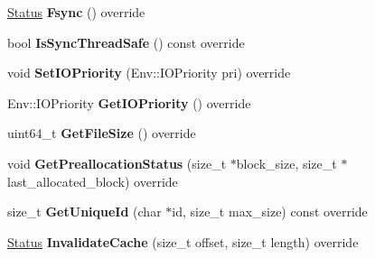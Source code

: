 \begin{DoxyCompactItemize}
\item 
\hyperlink{classrocksdb_1_1Status}{Status} {\bfseries Fsync} () override\hypertarget{classrocksdb_1_1WritableFileWrapper_addf5860aaa2745c0543c3fb2ba77c8d3}{}\label{classrocksdb_1_1WritableFileWrapper_addf5860aaa2745c0543c3fb2ba77c8d3}

\item 
bool {\bfseries Is\+Sync\+Thread\+Safe} () const override\hypertarget{classrocksdb_1_1WritableFileWrapper_abf6391522a133bbb532f34c60e1bae8a}{}\label{classrocksdb_1_1WritableFileWrapper_abf6391522a133bbb532f34c60e1bae8a}

\item 
void {\bfseries Set\+I\+O\+Priority} (Env\+::\+I\+O\+Priority pri) override\hypertarget{classrocksdb_1_1WritableFileWrapper_ab51961b1e6956249e33d8daec77ab511}{}\label{classrocksdb_1_1WritableFileWrapper_ab51961b1e6956249e33d8daec77ab511}

\item 
Env\+::\+I\+O\+Priority {\bfseries Get\+I\+O\+Priority} () override\hypertarget{classrocksdb_1_1WritableFileWrapper_a2b77b91c99b5c85c160fef7ea1db3a18}{}\label{classrocksdb_1_1WritableFileWrapper_a2b77b91c99b5c85c160fef7ea1db3a18}

\item 
uint64\+\_\+t {\bfseries Get\+File\+Size} () override\hypertarget{classrocksdb_1_1WritableFileWrapper_a3496a5c309a49099465d412f9a9dc813}{}\label{classrocksdb_1_1WritableFileWrapper_a3496a5c309a49099465d412f9a9dc813}

\item 
void {\bfseries Get\+Preallocation\+Status} (size\+\_\+t $\ast$block\+\_\+size, size\+\_\+t $\ast$last\+\_\+allocated\+\_\+block) override\hypertarget{classrocksdb_1_1WritableFileWrapper_a8f0f8c3ec4a18d25799d33dca8a935e0}{}\label{classrocksdb_1_1WritableFileWrapper_a8f0f8c3ec4a18d25799d33dca8a935e0}

\item 
size\+\_\+t {\bfseries Get\+Unique\+Id} (char $\ast$id, size\+\_\+t max\+\_\+size) const override\hypertarget{classrocksdb_1_1WritableFileWrapper_ab66f0f67f49cfb84240db1836417d793}{}\label{classrocksdb_1_1WritableFileWrapper_ab66f0f67f49cfb84240db1836417d793}

\item 
\hyperlink{classrocksdb_1_1Status}{Status} {\bfseries Invalidate\+Cache} (size\+\_\+t offset, size\+\_\+t length) override\hypertarget{classrocksdb_1_1WritableFileWrapper_a770ae6a5a4c0e60872cd8e382e1b5b55}{}\label{classrocksdb_1_1WritableFileWrapper_a770ae6a5a4c0e60872cd8e382e1b5b55}


\end{DoxyCompactItemize}
